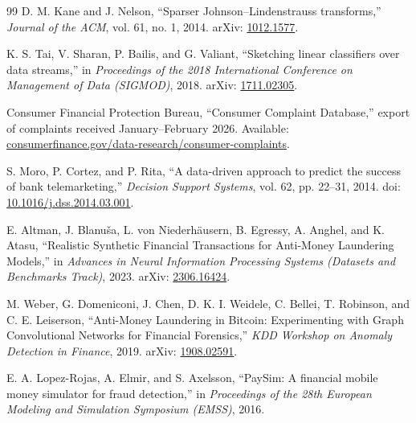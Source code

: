 \documentclass[10pt]{article}
\begin{document}
\begin{thebibliography}{99}
D. M. Kane and J. Nelson,
``Sparser Johnson--Lindenstrauss transforms,''
\textit{Journal of the ACM}, vol. 61, no. 1, 2014.
arXiv: \href{https://arxiv.org/abs/1012.1577}{1012.1577}.

K. S. Tai, V. Sharan, P. Bailis, and G. Valiant,
``Sketching linear classifiers over data streams,''
in \textit{Proceedings of the 2018 International Conference on Management of Data (SIGMOD)}, 2018.
arXiv: \href{https://arxiv.org/abs/1711.02305}{1711.02305}.

Consumer Financial Protection Bureau,
``Consumer Complaint Database,'' export of complaints received January--February 2026.
Available: \href{https://www.consumerfinance.gov/data-research/consumer-complaints/}{consumerfinance.gov/data-research/consumer-complaints}.

S. Moro, P. Cortez, and P. Rita,
``A data-driven approach to predict the success of bank telemarketing,''
\textit{Decision Support Systems}, vol. 62, pp. 22--31, 2014.
doi: \href{https://doi.org/10.1016/j.dss.2014.03.001}{10.1016/j.dss.2014.03.001}.

E. Altman, J. Blanu\v{s}a, L. von Niederh\"ausern, B. Egressy, A. Anghel, and K. Atasu,
``Realistic Synthetic Financial Transactions for Anti-Money Laundering Models,''
in \textit{Advances in Neural Information Processing Systems (Datasets and Benchmarks Track)}, 2023.
arXiv: \href{https://arxiv.org/abs/2306.16424}{2306.16424}.

M. Weber, G. Domeniconi, J. Chen, D. K. I. Weidele, C. Bellei, T. Robinson, and C. E. Leiserson,
``Anti-Money Laundering in Bitcoin: Experimenting with Graph Convolutional Networks for Financial Forensics,''
\textit{KDD Workshop on Anomaly Detection in Finance}, 2019.
arXiv: \href{https://arxiv.org/abs/1908.02591}{1908.02591}.

E. A. Lopez-Rojas, A. Elmir, and S. Axelsson,
``PaySim: A financial mobile money simulator for fraud detection,''
in \textit{Proceedings of the 28th European Modeling and Simulation Symposium (EMSS)}, 2016.

\end{thebibliography}
\end{document}
